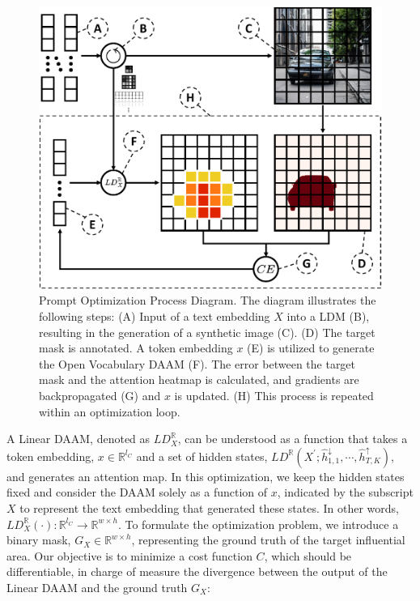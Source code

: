 \begin{figure}
    \centering
    \includegraphics[width=0.8\columnwidth]{img/3-methodology/optimization-diagram.pdf}
    \caption[Prompt Optimization Process Diagram]{Prompt Optimization Process Diagram. The diagram illustrates the following steps: (A) Input of a text embedding $X$ into a LDM (B), resulting in the generation of a synthetic image (C). (D) The target mask is annotated. A token embedding $x$ (E) is utilized to generate the Open Vocabulary DAAM (F). The error between the target mask and the attention heatmap is calculated, and gradients are backpropagated (G) and $x$ is updated. (H) This process is repeated within an optimization loop.}
    \label{fig:daam-optimization-diagram}
\end{figure}

A Linear DAAM, denoted as ${LD}^\mathbb{R}_X$, can be understood as a function that takes a token embedding, $x\in \mathbb{R}^{l_C}$ and a set of hidden states, ${LD}^\mathbb{R} ( X^\prime; \hat{h}_{1, 1}^\downarrow, \cdots, \hat{h}_{T, K}^\uparrow )$, and generates an attention map. In this optimization, we keep the hidden states fixed and consider the DAAM solely as a function of $x$, indicated by the subscript $X$ to represent the text embedding that generated these states. In other words, ${LD}^\mathbb{R}_X\left ( \cdot \right):\mathbb{R}^{l_C} \to \mathbb{R}^{w \times h}$. To formulate the optimization problem, we introduce a binary mask, $G_X \in \mathbb{R}^{w \times h}$, representing the ground truth of the target influential area. Our objective is to minimize a cost function $C$, which should be differentiable, in charge of measure the divergence between the output of the Linear DAAM and the ground truth $G_X$:


